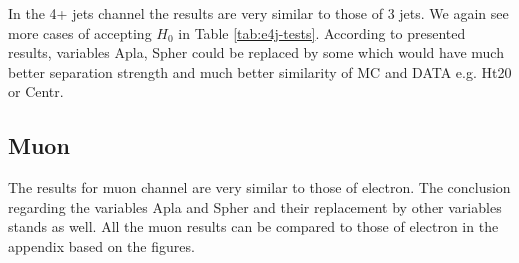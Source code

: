 In the 4+ jets channel the results are very similar to those of 3 jets. We again see more cases of accepting $H_0$ in Table \ref{tab:e4j-tests}. According to presented results, variables \textsf{Apla, Spher} could be replaced by some which would have much better separation strength and much better similarity of MC and DATA e.g. \textsf{Ht20} or \textsf{Centr}. 

\subsection{Muon}


The results for muon channel are very similar to those of electron. The conclusion regarding the variables \textsf{Apla} and \textsf{Spher} and their replacement by other variables stands as well. All the muon results can be compared to those of electron in the appendix based on the figures.

